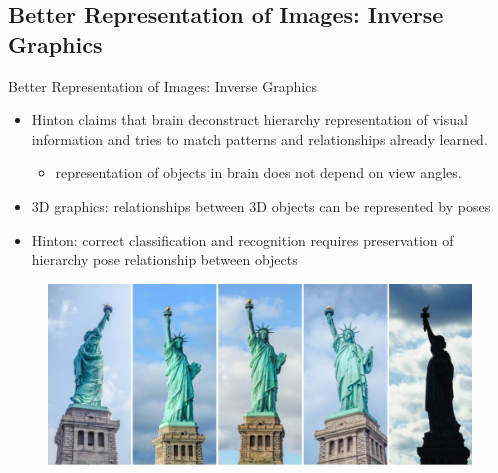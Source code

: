 \documentclass{beamer}
\begin{document}
\subsection{Better Representation of Images: Inverse Graphics}
\begin{frame}{Better Representation of Images: Inverse Graphics}
  \begin{itemize}
  \item {
    Hinton claims that brain deconstruct hierarchy representation of visual information and tries to match patterns and relationships already learned.
  }
      \begin{itemize}
        \item{representation of objects in brain does not depend on view angles.}
      \end{itemize}
  \item {   
    3D graphics: relationships between 3D objects can be represented by poses
  }
  \item {
    Hinton: correct classification and recognition requires preservation of hierarchy pose relationship between objects
  }
  \end{itemize}
  \begin{figure}[h]
    \includegraphics[scale=0.3]{statues.JPG}
    \end{figure}
\end{frame}
\end{document}
